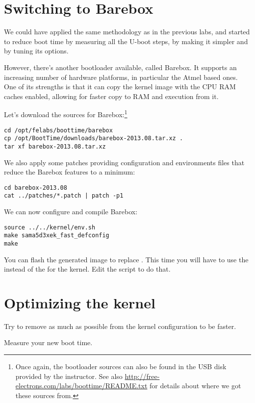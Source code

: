 
\section{Switching to Barebox}

We could have applied the same methodology as in the previous labs, and
started to reduce boot time by measuring all the U-boot steps, by making
it simpler and by tuning its options.

However, there's another bootloader available, called Barebox. It
supports an increasing number of hardware platforms, in particular the
Atmel based ones. One of its strengths is that it can copy the kernel
image with the CPU RAM caches enabled, allowing for faster copy to RAM
and execution from it.

Let's download the sources for Barebox:\footnote{Once again, the
bootloader sources can also be found in the USB disk provided by
the instructor. See also \url{http://free-electrons.com/labs/boottime/README.txt}
for details about where we got these sources from.}

\begin{verbatim}
cd /opt/felabs/boottime/barebox
cp /opt/BootTime/downloads/barebox-2013.08.tar.xz .
tar xf barebox-2013.08.tar.xz
\end{verbatim}

We also apply some patches providing configuration and environments files
that reduce the Barebox features to a minimum:

\begin{verbatim}
cd barebox-2013.08
cat ../patches/*.patch | patch -p1
\end{verbatim}

We can now configure and compile Barebox:

\begin{verbatim}
source ../../kernel/env.sh
make sama5d3xek_fast_defconfig
make
\end{verbatim}

You can flash the generated image  to
replace . This time you will have to use the
 instead of the  for the kernel. Edit the
 script to do that.

\section{Optimizing the kernel}

Try to remove as much as possible from the kernel configuration to be
faster.

Measure your new boot time.
